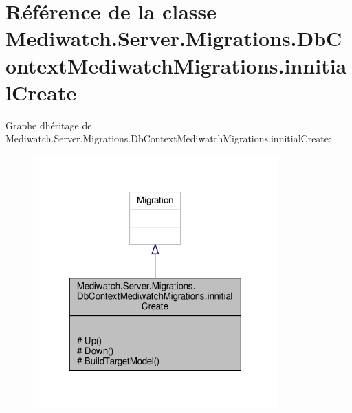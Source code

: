 \hypertarget{class_mediwatch_1_1_server_1_1_migrations_1_1_db_context_mediwatch_migrations_1_1innitial_create}{}\section{Référence de la classe Mediwatch.\+Server.\+Migrations.\+Db\+Context\+Mediwatch\+Migrations.\+innitial\+Create}
\label{class_mediwatch_1_1_server_1_1_migrations_1_1_db_context_mediwatch_migrations_1_1innitial_create}


Graphe d\textquotesingle{}héritage de Mediwatch.\+Server.\+Migrations.\+Db\+Context\+Mediwatch\+Migrations.\+innitial\+Create\+:
\nopagebreak
\begin{figure}[H]
\begin{center}
\leavevmode
\includegraphics[width=267pt]{class_mediwatch_1_1_server_1_1_migrations_1_1_db_context_mediwatch_migrations_1_1innitial_create__inherit__graph}
\end{center}
\end{figure}


